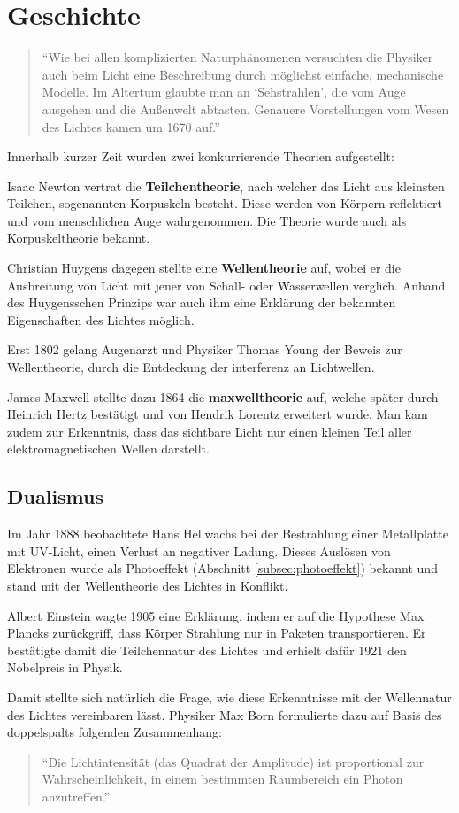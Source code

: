 \section{Geschichte}
\begin{quote}
\enquote{Wie bei allen komplizierten Naturphänomenen versuchten die Physiker auch beim Licht eine Beschreibung durch möglichst einfache, mechanische Modelle. Im Altertum glaubte man an \enquote{Sehstrahlen}, die vom Auge ausgehen und die Außenwelt abtasten. Genauere Vorstellungen vom Wesen des Lichtes kamen um 1670 auf.} \cite[S. 221]{physik1}
\end{quote}

Innerhalb kurzer Zeit wurden zwei konkurrierende Theorien aufgestellt:
\begin{outline}
	\1 Isaac Newton vertrat die \textbf{Teilchentheorie}, nach welcher das Licht aus kleinsten Teilchen, sogenannten Korpuskeln besteht. Diese werden von Körpern reflektiert und vom menschlichen Auge wahrgenommen. Die Theorie wurde auch als Korpuskeltheorie bekannt.
	
	\1 Christian Huygens dagegen stellte eine \textbf{Wellentheorie} auf, wobei er die Ausbreitung von Licht mit jener von Schall- oder Wasserwellen verglich. Anhand des Huygensschen Prinzips war auch ihm eine Erklärung der bekannten Eigenschaften des Lichtes möglich.
\end{outline}

Erst 1802 gelang Augenarzt und Physiker Thomas Young der Beweis zur Wellentheorie, durch die Entdeckung der \gls{interferenz} an Lichtwellen.

James Maxwell stellte dazu 1864 die \textbf{\gls{maxwelltheorie}} auf, welche später durch Heinrich Hertz bestätigt und von Hendrik Lorentz erweitert wurde. Man kam zudem zur Erkenntnis, dass das sichtbare Licht nur einen kleinen Teil aller elektromagnetischen Wellen darstellt.

\subsection{Dualismus}
Im Jahr 1888 beobachtete Hans Hellwachs bei der Bestrahlung einer Metallplatte mit UV-Licht, einen Verlust an negativer Ladung. Dieses Auslösen von Elektronen wurde als Photoeffekt (Abschnitt \ref{subsec:photoeffekt}) bekannt und stand mit der Wellentheorie des Lichtes in Konflikt.

Albert Einstein wagte 1905 eine Erklärung, indem er auf die Hypothese Max Plancks zurückgriff, dass Körper Strahlung nur in Paketen transportieren. Er bestätigte damit die Teilchennatur des Lichtes und erhielt dafür 1921 den Nobelpreis in Physik.

Damit stellte sich natürlich die Frage, wie diese Erkenntnisse mit der Wellennatur des Lichtes vereinbaren lässt. Physiker Max Born formulierte dazu auf Basis des \glspl{doppelspalt} folgenden Zusammenhang:
\begin{quote}
\enquote{Die Lichtintensität (das Quadrat der Amplitude) ist proportional zur Wahrscheinlichkeit, in einem bestimmten Raumbereich ein Photon anzutreffen.} \cite[S. 183]{physik2}
\end{quote}